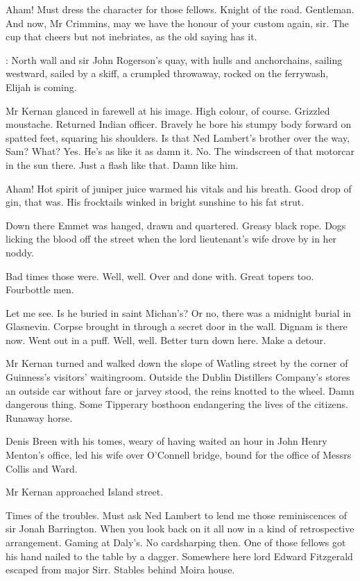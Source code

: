 Aham!
Must dress the character for those fellows.
Knight of the road.
Gentleman.
And now, Mr Crimmins,
may we have the honour of your custom again, sir.
The cup that cheers but not inebriates,
as the old saying has it.

:
North wall and sir John Rogerson's quay,
with hulls and anchorchains,
sailing westward,
sailed by a skiff,
a crumpled throwaway,
rocked on the
ferrywash,
Elijah is coming.

Mr Kernan glanced in farewell at his image.
High colour, of course.
Grizzled moustache.
Returned Indian officer.
Bravely he bore his stumpy body forward on spatted feet,
squaring his shoulders.
Is that Ned Lambert's brother over the way, Sam?
What?
Yes.
He's as like it as damn it.
No.
The windscreen of that motorcar in the sun there.
Just a flash like that.
Damn like him.%

Aham!
Hot spirit of juniper juice warmed his vitals and his breath.
Good
drop of gin, that was.
His frocktails winked in bright sunshine to his
fat strut.

Down there
Emmet was hanged, drawn and quartered.
Greasy black rope.
Dogs
licking the blood off the street
when the lord lieutenant's wife drove by
in her noddy.

Bad times those were.
Well, well.
Over and done with.
Great topers too.
Fourbottle men.

Let me see.
Is he buried in saint Michan's?
Or no, there was a midnight burial in Glasnevin.
Corpse brought in through a secret door in the wall.
Dignam is there now.
Went out in a puff.
Well, well.
Better turn down here.
Make a detour.

Mr Kernan turned and walked down the slope of Watling street
by the
corner of Guinness's visitors' waitingroom.
Outside the Dublin Distillers
Company's stores
an outside car without fare or jarvey stood,
the reins
knotted to the wheel.
Damn dangerous thing.
Some Tipperary bosthoon
endangering the lives of the citizens.
Runaway horse.

Denis Breen with his tomes,
weary of having waited an hour in John Henry Menton's office,
led his wife over O'Connell bridge,
bound for the office
of Messrs Collis and Ward.

Mr Kernan approached Island street.

Times of the troubles.
Must ask Ned Lambert to lend me
those
reminiscences of sir Jonah Barrington.
When you look back on it all now
in a kind of retrospective arrangement.
Gaming at Daly's.
No cardsharping
then.
One of those fellows got his hand nailed to the table by a dagger.
Somewhere here lord Edward Fitzgerald escaped from major Sirr.
Stables
behind Moira house.

